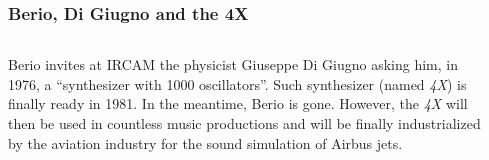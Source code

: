 \begin{frame}
    \frametitle{Berio, Di Giugno and the 4X} 

    \begin{columns}[T]
        \begin{column}{0.6\textwidth}
						\alert{Berio invites at IRCAM the physicist Giuseppe Di Giugno
						asking him, in 1976, a ``synthesizer with 1000 oscillators''.
						Such synthesizer (named \emph{4X}) is finally ready in 1981.
						In the meantime, Berio is gone.
						However, the \emph{4X} will then be used in countless music
						productions and will be finally industrialized by the aviation
						industry for the sound simulation of Airbus jets.}
        \end{column}
        \begin{column}{0.4\textwidth}
            \\
        \end{column}
    \end{columns}
\end{frame}
